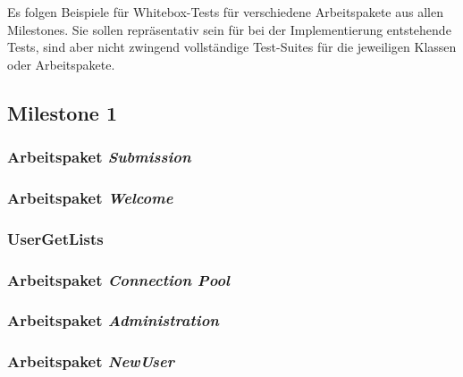 \lstset{
    language=Java,
    basicstyle=\ttfamily\selectfont\scriptsize,
}

\newcommand{\testlisting}[1]{}

Es folgen Beispiele für Whitebox-Tests für verschiedene Arbeitspakete aus allen Milestones.
Sie sollen repräsentativ sein für bei der Implementierung entstehende Tests, sind aber nicht zwingend vollständige
Test-Suites für die jeweiligen Klassen oder Arbeitspakete.

\subsection{Milestone 1}\label{subsec:milestone1}

\subsubsection{Arbeitspaket \emph{Submission}}
\testlisting{SubmissionBackingTest}
\testlisting{SubmissionServiceTest}
\testlisting{SubmissionRepositoryTest}

\subsubsection{Arbeitspaket \emph{Welcome}}
\testlisting{LoginServiceTest}

\subsubsection{UserGetLists}
\testlisting{UserRepositoryGetListTest}

\subsubsection{Arbeitspaket \emph{Connection Pool}}
\testlisting{TransactionTest}
\testlisting{ConnectionPoolTest}

\subsubsection{Arbeitspaket \emph{Administration}}
\testlisting{SystemSettingsRepositoryTest.java}

\subsubsection{Arbeitspaket \emph{NewUser}}
\testlisting{NewUserBackingTest.java}

